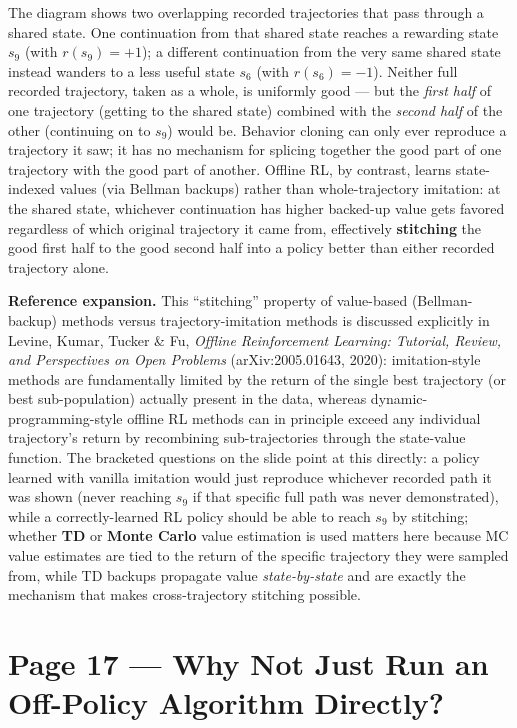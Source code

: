 \documentclass[11pt]{article}
\begin{document}
The diagram shows two overlapping recorded trajectories that pass through a shared state. One continuation from that shared state reaches a rewarding state $s_9$ (with $r(s_9)=+1$); a different continuation from the very same shared state instead wanders to a less useful state $s_6$ (with $r(s_6)=-1$). Neither full recorded trajectory, taken as a whole, is uniformly good --- but the \emph{first half} of one trajectory (getting to the shared state) combined with the \emph{second half} of the other (continuing on to $s_9$) would be. Behavior cloning can only ever reproduce a trajectory it saw; it has no mechanism for splicing together the good part of one trajectory with the good part of another. Offline RL, by contrast, learns state-indexed values (via Bellman backups) rather than whole-trajectory imitation: at the shared state, whichever continuation has higher backed-up value gets favored regardless of which original trajectory it came from, effectively \textbf{stitching} the good first half to the good second half into a policy better than either recorded trajectory alone.

\textbf{Reference expansion.} This ``stitching'' property of value-based (Bellman-backup) methods versus trajectory-imitation methods is discussed explicitly in Levine, Kumar, Tucker \& Fu, \emph{Offline Reinforcement Learning: Tutorial, Review, and Perspectives on Open Problems} (arXiv:2005.01643, 2020): imitation-style methods are fundamentally limited by the return of the single best trajectory (or best sub-population) actually present in the data, whereas dynamic-programming-style offline RL methods can in principle exceed any individual trajectory's return by recombining sub-trajectories through the state-value function. The bracketed questions on the slide point at this directly: a policy learned with vanilla imitation would just reproduce whichever recorded path it was shown (never reaching $s_9$ if that specific full path was never demonstrated), while a correctly-learned RL policy should be able to reach $s_9$ by stitching; whether \textbf{TD} or \textbf{Monte Carlo} value estimation is used matters here because MC value estimates are tied to the return of the specific trajectory they were sampled from, while TD backups propagate value \emph{state-by-state} and are exactly the mechanism that makes cross-trajectory stitching possible.

\section*{Page 17 --- Why Not Just Run an Off-Policy Algorithm Directly?}
\end{document}
